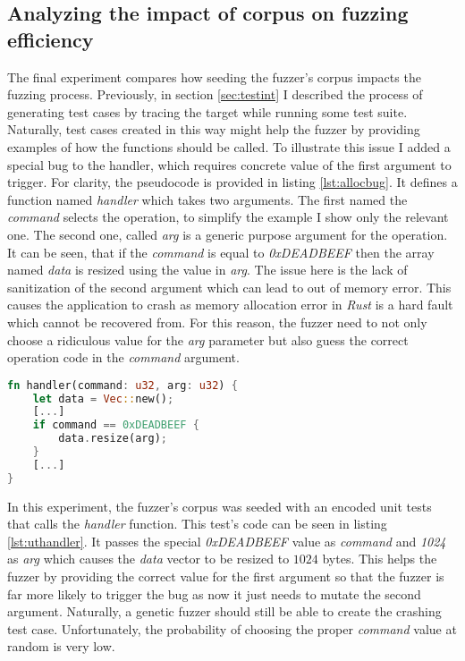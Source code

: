 \begin{itemize}
\begin{itemize}
\subsection{Analyzing the impact of corpus on fuzzing efficiency}
The final experiment compares how seeding the fuzzer's corpus impacts the fuzzing process. Previously, in section \ref{sec:testint} I described the process of generating test cases by tracing the target while running some test suite. Naturally, test cases created in this way might help the fuzzer by providing examples of how the functions should be called. To illustrate this issue I added a special bug to the handler, which requires concrete value of the first argument to trigger. For clarity, the pseudocode is provided in listing \ref{lst:allocbug}. It defines a function named \textit{handler} which takes two arguments. The first named the \textit{command} selects the operation, to simplify the example I show only the relevant one. The second one, called \textit{arg} is a generic purpose argument for the operation. It can be seen, that if the \textit{command} is equal to \textit{0xDEADBEEF} then the array named \textit{data} is resized using the value in \textit{arg}. The issue here is the lack of sanitization of the second argument which can lead to out of memory error. This causes the application to crash as memory allocation error in \textit{Rust} is a hard fault which cannot be recovered from. For this reason, the fuzzer need to not only choose a ridiculous value for the \textit{arg} parameter but also guess the correct operation code in the \textit{command} argument.  

\begin{minipage}{\linewidth}
    \begin{lstlisting}[language=rust,caption={The allocation bug pseudocode.},label={lst:allocbug}]
fn handler(command: u32, arg: u32) {
    let data = Vec::new();
    [...]
    if command == 0xDEADBEEF {
        data.resize(arg);
    }
    [...]
}
    \end{lstlisting}
\end{minipage}

In this experiment, the fuzzer's corpus was seeded with an encoded unit tests that calls the \textit{handler} function. This test's code can be seen in listing \ref{lst:uthandler}. It passes the special \textit{0xDEADBEEF} value as \textit{command} and \textit{1024} as \textit{arg} which causes the \textit{data} vector to be resized to $1024$ bytes. This helps the fuzzer by providing the correct value for the first argument so that the fuzzer is far more likely to trigger the bug as now it just needs to mutate the second argument. Naturally, a genetic fuzzer should still be able to create the crashing test case. Unfortunately, the probability of choosing the proper \textit{command} value at random is very low. 


\end{itemize}
\end{itemize}
